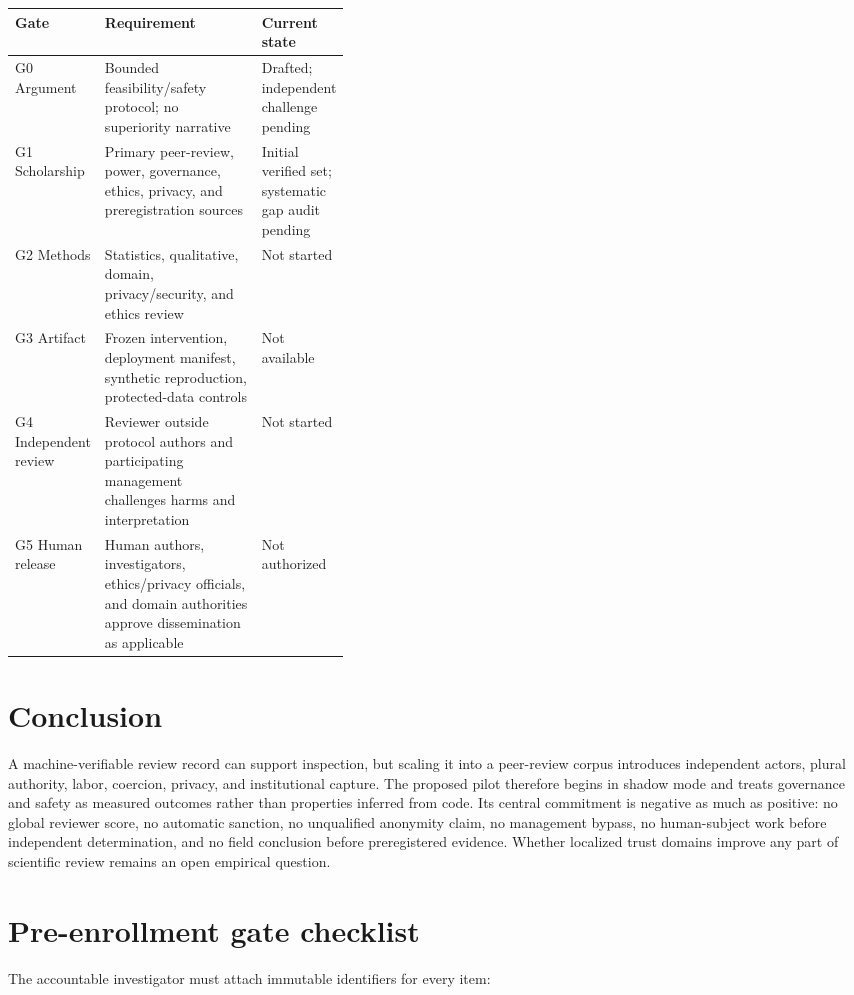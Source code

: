 \documentclass[11pt]{article}
\begin{document}
\begin{tabularx}{\linewidth}{p{0.19\linewidth}X p{0.20\linewidth}}
\toprule
Gate & Requirement & Current state \\
\midrule
G0 Argument & Bounded feasibility/safety protocol; no superiority narrative &
Drafted; independent challenge pending \\
G1 Scholarship & Primary peer-review, power, governance, ethics, privacy, and
preregistration sources & Initial verified set; systematic gap audit pending \\
G2 Methods & Statistics, qualitative, domain, privacy/security, and ethics review &
Not started \\
G3 Artifact & Frozen intervention, deployment manifest, synthetic reproduction,
protected-data controls & Not available \\
G4 Independent review & Reviewer outside protocol authors and participating
management challenges harms and interpretation & Not started \\
G5 Human release & Human authors, investigators, ethics/privacy officials, and
domain authorities approve dissemination as applicable & Not authorized \\
\bottomrule
\end{tabularx}

\section{Conclusion}

A machine-verifiable review record can support inspection, but scaling it into a
peer-review corpus introduces independent actors, plural authority, labor,
coercion, privacy, and institutional capture. The proposed pilot therefore begins
in shadow mode and treats governance and safety as measured outcomes rather than
properties inferred from code. Its central commitment is negative as much as
positive: no global reviewer score, no automatic sanction, no unqualified anonymity
claim, no management bypass, no human-subject work before independent determination,
and no field conclusion before preregistered evidence. Whether localized trust
domains improve any part of scientific review remains an open empirical question.

\appendix
\section{Pre-enrollment gate checklist}

The accountable investigator must attach immutable identifiers for every item:
\end{document}
